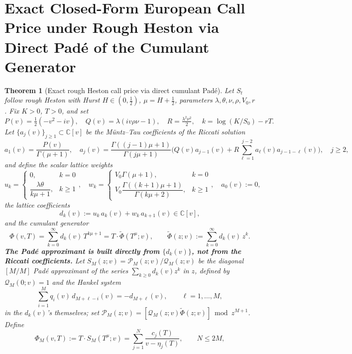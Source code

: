 \documentclass{article}
\newtheorem{theorem}{Theorem}
\newcommand{\C}{\mathbb{C}}
\begin{document}
\section*{Exact Closed-Form European Call Price under Rough Heston via
Direct Pad\'{e} of the Cumulant Generator}

\begin{theorem}[Exact rough Heston call price via direct cumulant Pad\'{e}]
\label{thm:main}
Let $S_t$ follow rough Heston with Hurst $H\in(0,\tfrac12)$,
$\mu=H+\tfrac12$, parameters $\lambda,\theta,\nu,\rho,V_0,r$. Fix
$K>0$, $T>0$, and set
\[
P(v)=\tfrac12(-v^2-iv),\quad
Q(v)=\lambda(iv\rho\nu-1),\quad
R=\tfrac{\lambda^2\nu^2}{2},\quad
k=\log(K/S_0)-rT.
\]
Let $\{a_j(v)\}_{j\ge 1}\subset\C[v]$ be the M\"{u}ntz--Tau coefficients
of the Riccati solution
\[
a_1(v)=\frac{P(v)}{\Gamma(\mu+1)},\quad
a_j(v)=\frac{\Gamma((j-1)\mu+1)}{\Gamma(j\mu+1)}\!
\Big(Q(v)a_{j-1}(v)+R\!\sum_{\ell=1}^{j-2}a_\ell(v)a_{j-1-\ell}(v)\Big),\quad
j\ge 2,
\]
and define the scalar lattice weights
\[
u_k=\begin{cases}0,&k=0\\[1pt]\dfrac{\lambda\theta}{k\mu+1},&k\ge 1\end{cases},\quad
w_k=\begin{cases}V_0\Gamma(\mu+1),&k=0\\[1pt]
V_0\dfrac{\Gamma((k+1)\mu+1)}{\Gamma(k\mu+2)},&k\ge 1\end{cases},\quad
a_0(v):=0,
\]
the lattice coefficients
\[
\boxed{\,d_k(v):=u_k\,a_k(v)+w_k\,a_{k+1}(v)\in\C[v],\,}
\]
and the cumulant generator
\begin{equation}\label{eq:Phi-direct}
\Phi(v,T)=\sum_{k=0}^{\infty}d_k(v)\,T^{k\mu+1}
=T\cdot\widetilde\Phi(T^\mu;v),\qquad
\widetilde\Phi(z;v):=\sum_{k=0}^{\infty}d_k(v)\,z^k.
\end{equation}
\textbf{The Pad\'{e} approximant is built directly from
$\{d_k(v)\}$, not from the Riccati coefficients.} Let
$S_M(z;v)=\mathcal{P}_M(z;v)/\mathcal{Q}_M(z;v)$ be the diagonal
$[M/M]$ Pad\'{e} approximant of the series $\sum_{k\ge 0}d_k(v)z^k$ in
$z$, defined by $\mathcal{Q}_M(0;v)=1$ and the Hankel system
\begin{equation}\label{eq:hankel-d}
\sum_{i=1}^{M}q_i(v)\,d_{M+\ell-i}(v)=-d_{M+\ell}(v),\qquad
\ell=1,\dots,M,
\end{equation}
in the $d_k(v)$'s themselves; set
$\mathcal{P}_M(z;v)=[\mathcal{Q}_M(z;v)\widetilde\Phi(z;v)]\bmod z^{M+1}$.
Define
\[
\Phi_M(v,T):=T\cdot S_M(T^\mu;v)
=\sum_{j=1}^{N}\frac{c_j(T)}{v-\eta_j(T)},\qquad N\le 2M,
\]
\end{theorem}
\end{document}
